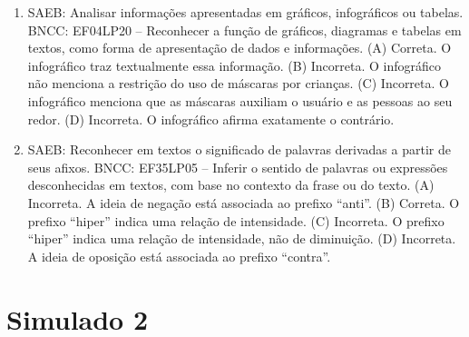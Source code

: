 \begin{enumerate}
\item
SAEB: Analisar informações apresentadas em gráficos, infográficos ou tabelas. BNCC: EF04LP20 -- Reconhecer a função de gráficos, diagramas e tabelas em textos, como forma de apresentação de dados e informações. 
(A) Correta. O infográfico traz textualmente essa informação. 
(B) Incorreta. O infográfico não menciona a restrição do uso de máscaras por crianças. 
(C) Incorreta. O infográfico menciona que as máscaras auxiliam o usuário e as pessoas ao seu redor. 
(D) Incorreta. O infográfico afirma exatamente o contrário.

\item
SAEB: Reconhecer em textos o significado de palavras derivadas a partir de seus afixos. BNCC: EF35LP05 -- Inferir o sentido de palavras ou expressões desconhecidas em textos, com base no contexto da frase ou do texto. 
(A) Incorreta. A ideia de negação está associada ao prefixo ``anti''. 
(B) Correta. O prefixo ``hiper'' indica uma relação de intensidade. 
(C) Incorreta. O prefixo ``hiper'' indica uma relação de intensidade, não de diminuição. 
(D) Incorreta. A ideia de oposição está associada ao prefixo ``contra''.
\end{enumerate}

\section*{Simulado 2}

